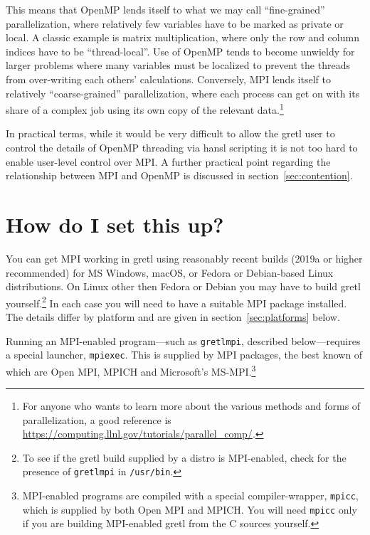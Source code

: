 \documentclass{article}
\begin{document}
This means that \textsf{OpenMP} lends itself to what we may call
``fine-grained'' parallelization, where relatively few variables have
to be marked as private or local. A classic example is matrix
multiplication, where only the row and column indices have to be
``thread-local''. Use of \textsf{OpenMP} tends to become unwieldy for
larger problems where many variables must be localized to prevent the
threads from over-writing each others' calculations.  Conversely, MPI
lends itself to relatively ``coarse-grained'' parallelization, where
each process can get on with its share of a complex job using its own
copy of the relevant data.\footnote{For anyone who wants to learn more
  about the various methods and forms of parallelization, a good
  reference is
  \url{https://computing.llnl.gov/tutorials/parallel_comp/}.}

In practical terms, while it would be very difficult to allow the
gretl user to control the details of \textsf{OpenMP} threading via
hansl scripting it is not too hard to enable user-level control over
MPI.  A further practical point regarding the relationship between MPI
and \textsf{OpenMP} is discussed in section~\ref{sec:contention}.

\section{How do I set this up?}
\label{sec:setup}

You can get MPI working in gretl using reasonably recent builds (2019a
or higher recommended) for MS Windows, macOS, or Fedora or
Debian-based Linux distributions. On Linux other then Fedora or Debian
you may have to build gretl yourself.\footnote{To see if the gretl
  build supplied by a distro is MPI-enabled, check for the presence of
  \texttt{gretlmpi} in \texttt{/usr/bin}.} In each case you will need
to have a suitable MPI package installed. The details differ by
platform and are given in section~\ref{sec:platforms} below.

Running an MPI-enabled program---such as \texttt{gretlmpi}, described
below---requires a special launcher, \texttt{mpiexec}.  This is
supplied by MPI packages, the best known of which are \textsf{Open
  MPI}, \textsf{MPICH} and Microsoft's
\textsf{MS-MPI}.\footnote{MPI-enabled programs are compiled with a
  special compiler-wrapper, \texttt{mpicc}, which is supplied by both
  \textsf{Open MPI} and \textsf{MPICH}. You will need \texttt{mpicc}
  only if you are building MPI-enabled gretl from the C sources
  yourself.}
\end{document}
